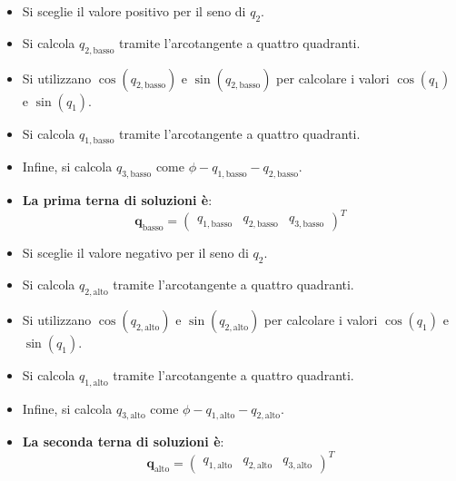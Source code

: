 \documentclass[11pt, a4paper]{article}
\begin{document}

\begin{itemize}
   \item Si sceglie il valore positivo per il seno di $q_2$.
   \item Si calcola $q_{2,\text{basso}}$ tramite l'arcotangente a quattro quadranti.
   \item Si utilizzano $\cos(q_{2,\text{basso}})$ e $\sin(q_{2,\text{basso}})$ per calcolare i valori $\cos(q_1)$ e $\sin(q_1)$.
   \item Si calcola $q_{1,\text{basso}}$ tramite l'arcotangente a quattro quadranti.
   \item Infine, si calcola $q_{3,\text{basso}}$ come $\phi - q_{1,\text{basso}} - q_{2,\text{basso}}$.
   \item \textbf{La prima terna di soluzioni è}:
   \[
     \mathbf{q}_{\text{basso}} = \begin{pmatrix} q_{1,\text{basso}} & q_{2,\text{basso}} & q_{3,\text{basso}} \end{pmatrix}^T
   \]
\end{itemize}
\newpage
{}

\begin{itemize}
   \item Si sceglie il valore negativo per il seno di $q_2$.
   \item Si calcola $q_{2,\text{alto}}$ tramite l'arcotangente a quattro quadranti.
   \item Si utilizzano $\cos(q_{2,\text{alto}})$ e $\sin(q_{2,\text{alto}})$ per calcolare i valori $\cos(q_1)$ e $\sin(q_1)$.
   \item Si calcola $q_{1,\text{alto}}$ tramite l'arcotangente a quattro quadranti.
   \item Infine, si calcola $q_{3,\text{alto}}$ come $\phi - q_{1,\text{alto}} - q_{2,\text{alto}}$.
   \item \textbf{La seconda terna di soluzioni è}:
   \[
     \mathbf{q}_{\text{alto}} = \begin{pmatrix} q_{1,\text{alto}} & q_{2,\text{alto}} & q_{3,\text{alto}} \end{pmatrix}^T
   \]
\end{itemize}

\end{document}
